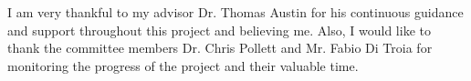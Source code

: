 I am very thankful to my advisor Dr. Thomas Austin for his continuous guidance and support throughout this project and believing me. Also, I would like to thank the committee members Dr. Chris Pollett and Mr. Fabio Di Troia for monitoring the progress of the project and their valuable time.